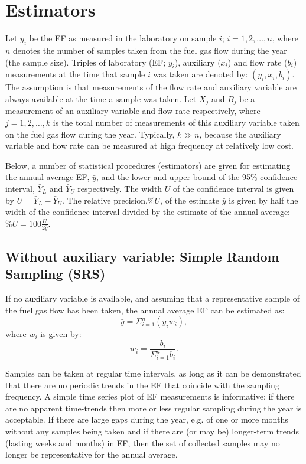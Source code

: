 \clearpage
\section{Estimators}\label{Estimators}
 
Let $y_i$ be the EF as measured in the laboratory on sample $i$; $i=1,2,\ldots ,n$, where $n$ denotes the number of samples taken from the fuel gas flow during the year (the sample size). Triples of laboratory (EF; $y_i$), auxiliary ($x_i$) and flow rate ($b_i$) measurements at the time that sample $i$ was taken are denoted by: $(y_i,x_i,b_i)$. The assumption is that measurements of the flow rate and auxiliary variable are always available at the time a sample was taken. Let $X_{j}$ and $B_j$ be a measurement of an auxiliary variable and flow rate respectively, where $j=1,2,\ldots,k$ is the total number of measurements of this auxiliary variable taken on the fuel gas flow during the year. Typically, $k \gg n$, because the auxiliary variable and flow rate can be measured at high frequency at relatively low cost. 

Below, a number of statistical procedures (estimators) are given for estimating the annual average EF, $\bar{y}$, and the lower and upper bound of the 95\% confidence interval, $\bar{Y}_{L}$ and $\bar{Y}_{U}$ respectively. The width $U$ of the confidence interval is given by $U=\bar{Y}_{L}-\bar{Y}_{U}$. The relative precision,$\%U$, of the estimate $\bar{y}$ is given by half the width of the confidence interval divided by the estimate of the annual average: $\%U=100\frac{U}{2\bar{y}}$.

\subsection{Without auxiliary variable: Simple Random Sampling (SRS)}\label{SRS}
If no auxiliary variable is available, and assuming that a representative sample of the fuel gas flow has been taken, the annual average EF can be estimated as:
\begin{equation}\label{eqn:SRS}
\bar{y}=\Sigma_{i=1}^{n}(y_i w_i),
\end{equation}
where $w_i$ is given by:
\begin{equation}\label{eqn:weights}
w_i=\frac{b_i}{\Sigma_{i=1}^{n}b_i}.
\end{equation}

Samples can be taken at regular time intervals, as long as it can be demonstrated that there are no periodic trends in the EF that coincide with the sampling frequency. A simple time series plot of EF measurements is informative: if there are no apparent time-trends then more or less regular sampling during the year is acceptable. If there are large gaps during the year, e.g. of one or more months without any samples being taken and if there are (or may be) longer-term trends (lasting weeks and months) in EF, then the set of collected samples may no longer be representative for the annual average.

